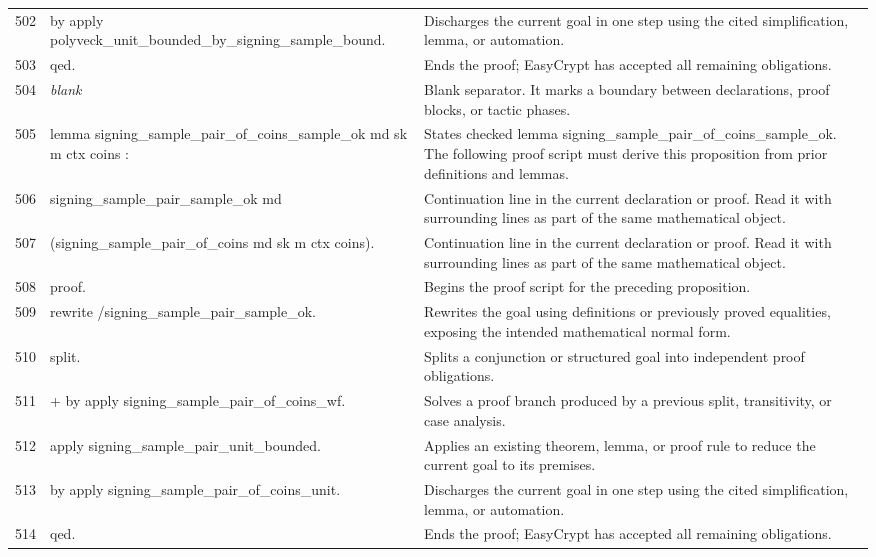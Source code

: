 \documentclass[10pt]{article}
\begin{document}
\begin{longtable}{r L{0.53\textwidth} L{0.37\textwidth}}
502 & {\ttfamily\scriptsize by apply polyveck\_unit\_bounded\_by\_signing\_sample\_bound.} & Discharges the current goal in one step using the cited simplification, lemma, or automation. \\
503 & {\ttfamily\scriptsize qed.} & Ends the proof; EasyCrypt has accepted all remaining obligations. \\
504 & {\ttfamily\scriptsize \emph{blank}} & Blank separator.  It marks a boundary between declarations, proof blocks, or tactic phases. \\
505 & {\ttfamily\scriptsize lemma signing\_sample\_pair\_of\_coins\_sample\_ok md sk m ctx coins :} & States checked lemma signing\_sample\_pair\_of\_coins\_sample\_ok.  The following proof script must derive this proposition from prior definitions and lemmas. \\
506 & {\ttfamily\scriptsize   signing\_sample\_pair\_sample\_ok md} & Continuation line in the current declaration or proof.  Read it with surrounding lines as part of the same mathematical object. \\
507 & {\ttfamily\scriptsize     (signing\_sample\_pair\_of\_coins md sk m ctx coins).} & Continuation line in the current declaration or proof.  Read it with surrounding lines as part of the same mathematical object. \\
508 & {\ttfamily\scriptsize proof.} & Begins the proof script for the preceding proposition. \\
509 & {\ttfamily\scriptsize rewrite /signing\_sample\_pair\_sample\_ok.} & Rewrites the goal using definitions or previously proved equalities, exposing the intended mathematical normal form. \\
510 & {\ttfamily\scriptsize split.} & Splits a conjunction or structured goal into independent proof obligations. \\
511 & {\ttfamily\scriptsize + by apply signing\_sample\_pair\_of\_coins\_wf.} & Solves a proof branch produced by a previous split, transitivity, or case analysis. \\
512 & {\ttfamily\scriptsize apply signing\_sample\_pair\_unit\_bounded.} & Applies an existing theorem, lemma, or proof rule to reduce the current goal to its premises. \\
513 & {\ttfamily\scriptsize by apply signing\_sample\_pair\_of\_coins\_unit.} & Discharges the current goal in one step using the cited simplification, lemma, or automation. \\
514 & {\ttfamily\scriptsize qed.} & Ends the proof; EasyCrypt has accepted all remaining obligations. \\

\end{longtable}
\end{document}
